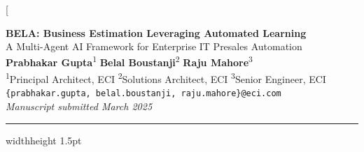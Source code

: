 \documentclass[10pt,twocolumn]{article}
\begin{document}

\twocolumn[{%
  \begin{center}
    {\fontsize{18}{22}\selectfont\bfseries\color{ECIDark}
      BELA: Business Estimation Leveraging Automated Learning}\\[6pt]
    {\large\color{ECIBlue}
      A Multi-Agent AI Framework for Enterprise IT Presales Automation}\\[14pt]
    {\normalsize
      \textbf{Prabhakar Gupta}\textsuperscript{1}\quad
      \textbf{Belal Boustanji}\textsuperscript{2}\quad
      \textbf{Raju Mahore}\textsuperscript{3}}\\[4pt]
    {\small\color{MidGray}
      \textsuperscript{1}Principal Architect, ECI \quad
      \textsuperscript{2}Solutions Architect, ECI \quad
      \textsuperscript{3}Senior Engineer, ECI}\\[2pt]
    {\small\color{MidGray}
      \texttt{\{prabhakar.gupta, belal.boustanji, raju.mahore\}@eci.com}}\\[10pt]
    {\small\textit{Manuscript submitted March 2025}}
  \end{center}
  \vspace{8pt}
  \hrule width\linewidth height 1.5pt
  \vspace{8pt}

}
\end{document}
